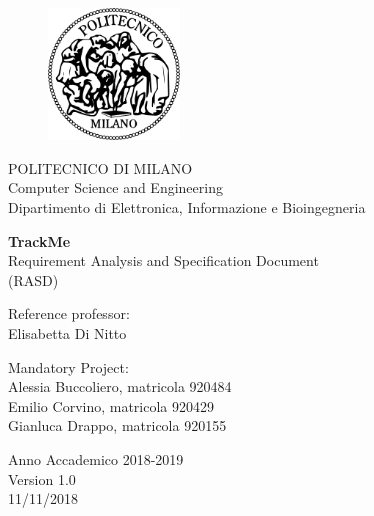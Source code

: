 \thispagestyle{empty}

\vspace*{-2.5cm} 
\bfseries{
    \begin{center}
    
    \begin{figure}[htbp]
        \begin{center}
          \includegraphics[width=3.5cm]{./pictures/logopm}
        \end{center}
      \end{figure}
    
      \large
      POLITECNICO DI MILANO\\
      \normalsize
      Computer Science and Engineering \\
      Dipartimento di Elettronica, Informazione e Bioingegneria\\
      
      \vspace*{3.3cm} \LARGE
    
      \textbf{TrackMe}\\
      
      \vspace*{.75truecm} \large
        Requirement Analysis and Specification Document \\
        (RASD)
    \end{center}

    \vspace*{2.0cm} \large
    \begin{flushleft}
    
      Reference professor: \\
      Elisabetta Di Nitto
    
    \end{flushleft}
    
    \vspace*{1.0cm}
    \begin{flushright}
    
    Mandatory Project:\\
    Alessia Buccoliero, matricola 920484\\
    Emilio Corvino, matricola 920429\\
    Gianluca Drappo, matricola 920155
    
    \end{flushright}
    
    \vspace*{0.5cm}
    \begin{center}
    
      Anno Accademico 2018-2019 \\
      
      \vspace*{0.6cm}
      Version 1.0 \\
      11/11/2018 \\
    \end{center} \clearpage
}